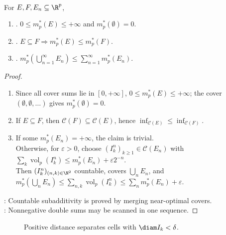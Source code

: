 \begin{theorem} \label{thm:cell-cover-outer-measure-basic-properties} \\
For $E,F,E_n\subseteq\R^p$,
\begin{enumerate}[label=(\roman*)]
\setlength{\itemsep}{0pt}
\item {}. $0\leq m_p^\ast(E)\leq+\infty$ and $m_p^\ast(\emptyset)=0$.
\item {}. $E\subseteq F\Longrightarrow m_p^\ast(E)\leq m_p^\ast(F)$.
\item {}. $m_p^\ast(\bigcup_{n=1}^{\infty}E_n)\leq\sum_{n=1}^{\infty}m_p^\ast(E_n)$.
\end{enumerate}
\begin{proof}
\begin{enumerate}[label=(\roman*)]
\setlength{\itemsep}{0pt}
\item Since all cover sums lie in $[0,+\infty]$, $0\leq m_p^\ast(E)\leq+\infty$; the cover $(\emptyset,\emptyset,\ldots)$ gives $m_p^\ast(\emptyset)=0$.
\item If $E\subseteq F$, then $\mathcal{C}(F)\subseteq\mathcal{C}(E)$, hence $\inf_{\mathcal{C}(E)}\leq\inf_{\mathcal{C}(F)}$.
\item If some $m_p^\ast(E_n)=+\infty$, the claim is trivial.\\
Otherwise, for $\varepsilon>0$, choose $(I_k^n)_{k\geq1}\in\mathcal{C}(E_n)$ with $\sum_k\operatorname{vol}_p(I_k^n)\leq m_p^\ast(E_n)+\varepsilon2^{-n}$.\\
Then $(I_k^n)_{(n,k)\in\N^2}$ countable, covers $\bigcup_nE_n$, and $m_p^\ast(\bigcup_nE_n)\leq\sum_{n,k}\operatorname{vol}_p(I_k^n)\leq\sum_nm_p^\ast(E_n)+\varepsilon$.
\end{enumerate}
: Countable subadditivity is proved by merging near-optimal covers.\\
: Nonnegative double sums may be scanned in one sequence.
\end{proof}
\end{theorem}

\begin{figure}[H]
  \centering
  
  \caption{Positive distance separates cells with $\diam I_k<\delta$.}
  \label{fig:positive-distance-cell-cover-split}
\end{figure}

